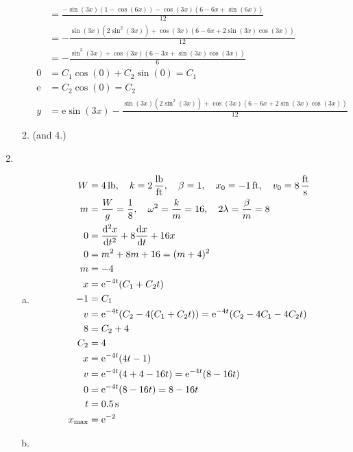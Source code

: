 \documentclass[12pt, A4]{article}
\newcommand{\en}{\text{e}}
\newcommand{\subt}[2]{#1_{\text{#2}}}
\begin{document}
\begin{enumerate}[Q1]
\begin{enumerate}[1.]
\begin{align*}
							&= \frac{-\sin(3x)(1 - \cos(6x)) - \cos(3x)(6 - 6x + \sin(6x))}{12} \\
							&= -\frac{\sin(3x)(2\sin^2(3x)) + \cos(3x)(6 - 6x + 2\sin(3x)\cos(3x))}{12} \\
							&= -\frac{\sin^3(3x) + \cos(3x)(6 - 3x + \sin(3x)\cos(3x))}{6} \\
						0 &= C_1\cos(0) + C_2\sin(0) 
								= C_1 \\
						\en &= C_2\cos(0)
								= C_2 \\
						y &= \en\sin(3x) -\frac{\sin(3x)(2\sin^2(3x)) + \cos(3x)(6 - 6x + 2\sin(3x)\cos(3x))}{12}
					\end{align*}
				\item (and 4.)
			\end{enumerate}
		\item
			\begin{enumerate}[(a)]
				\item
					\begin{align*}
						W &= 4 \,\mathrm{lb}, \quad
								k = 2 \,\mathrm{\frac{lb}{ft}}, \quad
								\beta = 1, \quad
								x_0 = -1 \,\mathrm{ft}, \quad
								v_0 = 8 \,\mathrm{\frac{ft}{s}} \\
						m &= \frac{W}{g}
								= \frac{1}{8}, \quad
								\omega^2 = \frac{k}{m}
									= 16, \quad
								2\lambda = \frac{\beta}{m}
										= 8 \\
						0 &= \dv[2]{x}{t} + 8\dv{x}{t} + 16x \\
						0 &= m^2 + 8m + 16
								= (m + 4)^2 \\
							m &= -4 \\
						x &= \en^{-4t}(C_1 + C_2t) \\
						-1 &= C_1 \\
						v &= \en^{-4t}(C_2 - 4(C_1 + C_2t))
								= \en^{-4t}(C_2 - 4C_1 - 4C_2t) \\
						8 &= C_2 + 4 \\
						C_2 &= 4 \\
						x &= \en^{-4t}(4t - 1) \\
						v &= \en^{-4t}(4 + 4 - 16t)
								= \en^{-4t}(8 - 16t) \\
						0 &= \en^{-4t}(8 - 16t)
								= 8 - 16t \\
						t &= 0.5 \,\mathrm{s} \\
						\subt{x}{max} &= \en^{-2}
					\end{align*}
				\item
			\end{enumerate}
	\end{enumerate}
	
\end{document}
